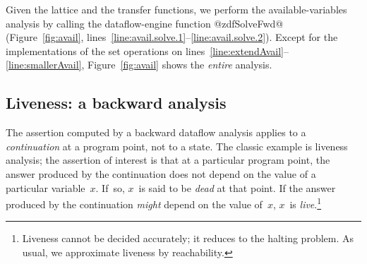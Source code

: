 \documentclass[blockstyle,preprint,natbib,nocopyrightspace]{sigplanconf}
\newcommand\linerangeref[2]{\mbox{lines~\ref{line:#1}--\ref{line:#2}}}
\newcommand{\authornote}[1]{{\em #1}}
\def\authornote#1{\unskip\relax}
\newcommand{\simon}[1]{\authornote{SLPJ: #1}}
\newcommand\seclabel[1]{\label{sec:#1}}
\newcommand\figref[1]{Figure~\ref{fig:#1}}
\begin{document}

Given the lattice and the transfer functions,
we perform the available-variables analysis by calling
the dataflow-engine function @zdfSolveFwd@ (\figref{avail},
\linerangeref{avail.solve.1}{avail.solve.2}). 
\simon{But this is really a lie. We actually call the transformation 
function!  I'm not quite sure how to fix this pedagogical point.}
Except for the implementations of the set operations on
\linerangeref{extendAvail}{smallerAvail}, 
\figref{avail} shows the \emph{entire} analysis.

\subsection{Liveness: a backward analysis} 

\seclabel{liveness}

The assertion computed by 
a backward dataflow analysis applies to a
\emph{continuation} at a program point, not to a state.
The classic example is liveness analysis;
the assertion of interest is that at a particular program point,
the answer produced by the continuation does not depend on
the value of a particular variable~$x$.
If~so, $x$~is said to be \emph{dead} at that point.
If the answer produced by the continuation \emph{might} depend on the
value of~$x$, $x$~is \emph{live}.\footnote
{Liveness cannot be decided accurately; it reduces to the halting problem.
As usual, we approximate liveness by reachability.}
\end{document}
